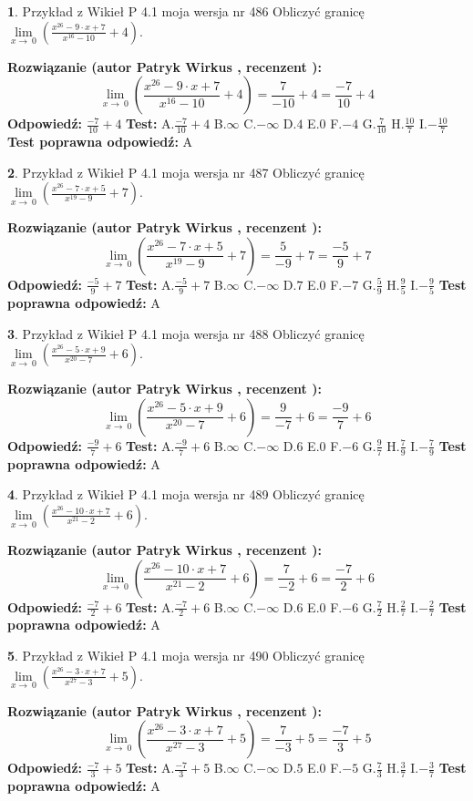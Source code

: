 \documentclass[12pt, a4paper]{article}
\theoremstyle{definition} %
\newtheorem{zad}{}
\newcommand{\zadStart}[1]{\begin{zad}#1\newline}
\newcommand{\zadStop}{\end{zad}}
\newcommand{\rozwStart}[2]{\noindent \textbf{Rozwiązanie (autor #1 , recenzent #2): }\newline}
\newcommand{\rozwStop}{\newline}
\newcommand{\odpStart}{\noindent \textbf{Odpowiedź:}\newline}
\newcommand{\odpStop}{\newline}
\newcommand{\testStart}{\noindent \textbf{Test:}\newline}
\newcommand{\testStop}{\newline}
\newcommand{\kluczStart}{\noindent \textbf{Test poprawna odpowiedź:}\newline}
\newcommand{\kluczStop}{\newline}
\begin{document}
\zadStart{Przykład z Wikieł P 4.1 moja wersja nr 486}
Obliczyć granicę $\lim\limits_{x\to\ 0}(\frac{x^{26}-9 \cdot x +7}{x^{16}-10}+4)$.
\zadStop
\rozwStart{Patryk Wirkus}{}
$$\lim\limits_{x\to\ 0}(\frac{x^{26}-9 \cdot x +7}{x^{16}-10}+4)=\frac{7}{-10}+4=\frac{-7}{10}+4$$
\rozwStop
\odpStart
$\frac{-7}{10}+4$
\odpStop
\testStart
A.$\frac{-7}{10}+4$
B.$\infty$
C.$-\infty$
D.$4$
E.$0$
F.$-4$
G.$\frac{7}{10}$
H.$\frac{10}{7}$
I.$-\frac{10}{7}$
\testStop
\kluczStart
A
\kluczStop



\zadStart{Przykład z Wikieł P 4.1 moja wersja nr 487}
Obliczyć granicę $\lim\limits_{x\to\ 0}(\frac{x^{26}-7 \cdot x +5}{x^{19}-9}+7)$.
\zadStop
\rozwStart{Patryk Wirkus}{}
$$\lim\limits_{x\to\ 0}(\frac{x^{26}-7 \cdot x +5}{x^{19}-9}+7)=\frac{5}{-9}+7=\frac{-5}{9}+7$$
\rozwStop
\odpStart
$\frac{-5}{9}+7$
\odpStop
\testStart
A.$\frac{-5}{9}+7$
B.$\infty$
C.$-\infty$
D.$7$
E.$0$
F.$-7$
G.$\frac{5}{9}$
H.$\frac{9}{5}$
I.$-\frac{9}{5}$
\testStop
\kluczStart
A
\kluczStop



\zadStart{Przykład z Wikieł P 4.1 moja wersja nr 488}
Obliczyć granicę $\lim\limits_{x\to\ 0}(\frac{x^{26}-5 \cdot x +9}{x^{20}-7}+6)$.
\zadStop
\rozwStart{Patryk Wirkus}{}
$$\lim\limits_{x\to\ 0}(\frac{x^{26}-5 \cdot x +9}{x^{20}-7}+6)=\frac{9}{-7}+6=\frac{-9}{7}+6$$
\rozwStop
\odpStart
$\frac{-9}{7}+6$
\odpStop
\testStart
A.$\frac{-9}{7}+6$
B.$\infty$
C.$-\infty$
D.$6$
E.$0$
F.$-6$
G.$\frac{9}{7}$
H.$\frac{7}{9}$
I.$-\frac{7}{9}$
\testStop
\kluczStart
A
\kluczStop



\zadStart{Przykład z Wikieł P 4.1 moja wersja nr 489}
Obliczyć granicę $\lim\limits_{x\to\ 0}(\frac{x^{26}-10 \cdot x +7}{x^{21}-2}+6)$.
\zadStop
\rozwStart{Patryk Wirkus}{}
$$\lim\limits_{x\to\ 0}(\frac{x^{26}-10 \cdot x +7}{x^{21}-2}+6)=\frac{7}{-2}+6=\frac{-7}{2}+6$$
\rozwStop
\odpStart
$\frac{-7}{2}+6$
\odpStop
\testStart
A.$\frac{-7}{2}+6$
B.$\infty$
C.$-\infty$
D.$6$
E.$0$
F.$-6$
G.$\frac{7}{2}$
H.$\frac{2}{7}$
I.$-\frac{2}{7}$
\testStop
\kluczStart
A
\kluczStop



\zadStart{Przykład z Wikieł P 4.1 moja wersja nr 490}
Obliczyć granicę $\lim\limits_{x\to\ 0}(\frac{x^{26}-3 \cdot x +7}{x^{27}-3}+5)$.
\zadStop
\rozwStart{Patryk Wirkus}{}
$$\lim\limits_{x\to\ 0}(\frac{x^{26}-3 \cdot x +7}{x^{27}-3}+5)=\frac{7}{-3}+5=\frac{-7}{3}+5$$
\rozwStop
\odpStart
$\frac{-7}{3}+5$
\odpStop
\testStart
A.$\frac{-7}{3}+5$
B.$\infty$
C.$-\infty$
D.$5$
E.$0$
F.$-5$
G.$\frac{7}{3}$
H.$\frac{3}{7}$
I.$-\frac{3}{7}$
\testStop
\kluczStart
A
\kluczStop
\end{document}
